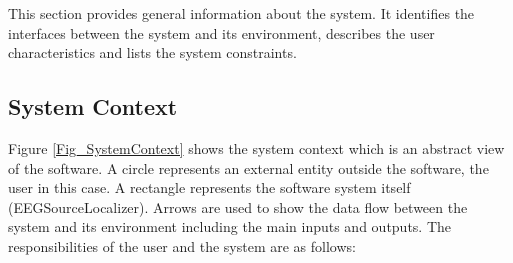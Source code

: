 \documentclass[12pt]{article}
\begin{document}
This section provides general information about the system.  It identifies the
interfaces between the system and its environment, describes the user
characteristics and lists the system constraints.  
%

\subsection{System Context}


Figure \ref{Fig_SystemContext} shows the system context which is an abstract view of the software. A circle represents an external entity outside the software, the user in this case. A rectangle represents the software system itself (EEGSourceLocalizer). Arrows are used to show the data flow between the system and its environment including the main inputs and outputs. The responsibilities of the user and the system are as follows:

\end{document}
